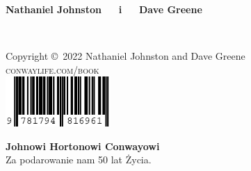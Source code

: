 \documentclass[11pt,twoside]{book}
\begin{document}
\vspace*{5.55in}\textbf{\textsf{{\fontsize{16}{40}\selectfont Nathaniel Johnston} $\quad$ i $\quad$ {\fontsize{16}{40}\selectfont Dave Greene}}}
\vfill
\endgroup
\newpage
\fi


~\vfill
\thispagestyle{empty}

\noindent Copyright \copyright\ 2022 Nathaniel Johnston and Dave Greene\\ %


\noindent \textsc{conwaylife.com/book}\\[0.2cm] %

\noindent \includegraphics[width=4cm]{images/isbn.pdf}



\clearpage

\vspace*{1.5in}
\begin{center}
	\textbf{\large Johnowi Hortonowi Conwayowi}\\Za podarowanie nam 50 lat Życia.
\end{center}






\setcounter{tocdepth}{1}
\pagestyle{empty} %

\tableofcontents %

\cleardoublepage %
\end{document}
